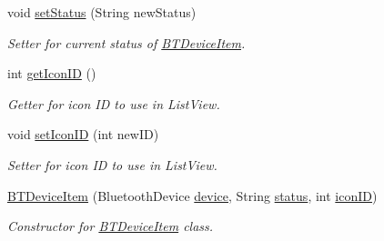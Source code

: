 \begin{DoxyCompactItemize}
void \hyperlink{class_android_app_1_1_b_t_device_item_a3e7e6d991363b670a71f4634bc5e4f27}{set\+Status} (String new\+Status)
\begin{DoxyCompactList}\small\item\em Setter for current status of \hyperlink{class_android_app_1_1_b_t_device_item}{B\+T\+Device\+Item}. \end{DoxyCompactList}\item 
int \hyperlink{class_android_app_1_1_b_t_device_item_a42c00ce200fd487f51e2016ed65cdf22}{get\+Icon\+ID} ()
\begin{DoxyCompactList}\small\item\em Getter for icon ID to use in List\+View. \end{DoxyCompactList}\item 
void \hyperlink{class_android_app_1_1_b_t_device_item_a893140b78c17184a199ac419f0fc7be7}{set\+Icon\+ID} (int new\+ID)
\begin{DoxyCompactList}\small\item\em Setter for icon ID to use in List\+View. \end{DoxyCompactList}\item 
\hyperlink{class_android_app_1_1_b_t_device_item_a8a172bb68f01d765ec832d62008502bc}{B\+T\+Device\+Item} (Bluetooth\+Device \hyperlink{class_android_app_1_1_b_t_device_item_a3f62f8de1d815f2e4f59030565ba29a1}{device}, String \hyperlink{class_android_app_1_1_b_t_device_item_a53c37efab7ea4550d4db428b3d6915e0}{status}, int \hyperlink{class_android_app_1_1_b_t_device_item_aa008dfacbd2f948952a14bed413d5969}{icon\+ID})
\begin{DoxyCompactList}\small\item\em Constructor for \hyperlink{class_android_app_1_1_b_t_device_item}{B\+T\+Device\+Item} class. \end{DoxyCompactList}\end{DoxyCompactItemize}

